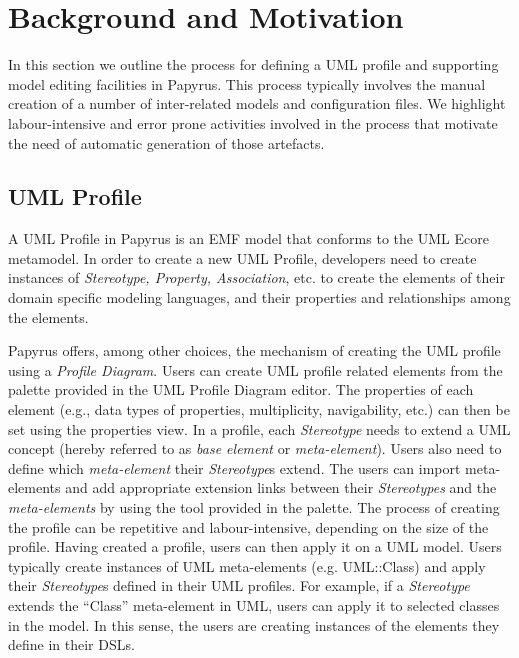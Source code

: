 \section{Background and Motivation}
\label{sec:background}

In this section we outline the process for defining a UML profile and supporting model editing facilities in Papyrus. 
This process typically involves the manual creation of a number of inter-related models and configuration files.
We highlight labour-intensive and error prone activities involved in the process that motivate the need of automatic generation of those artefacts.

\subsection{UML Profile}
A UML Profile in Papyrus is an EMF model that conforms to the UML Ecore metamodel. 
In order to create a new UML Profile, developers need to create instances of \textit{Stereotype, Property, Association}, etc. to create the elements of their domain specific modeling languages, and their properties and relationships among the elements.

Papyrus offers, among other choices, the mechanism of creating the UML profile using a \textit{Profile Diagram}. 
Users can create UML profile related elements from the palette provided in the UML Profile Diagram editor.
The properties of each element (e.g., data types of properties, multiplicity, navigability, etc.) can then be set using the properties view. 
In a profile, each \textit{Stereotype} needs to extend a UML concept (hereby referred to as \textit{base element} or \textit{meta-element}). 
Users also need to define which \textit{meta-element} their \textit{Stereotype}s extend. 
The users can import meta-elements and add appropriate extension links between their \textit{Stereotypes} and the \textit{meta-elements} by using the tool provided in the palette.
The process of creating the profile can be repetitive and labour-intensive, depending on the size of the profile.
Having created a profile, users can then apply it on a UML model. 
Users typically create instances of UML meta-elements (e.g. UML::Class) and apply their \textit{Stereotype}s defined in their UML profiles. 
For example, if a \textit{Stereotype} extends the ``Class'' meta-element in UML, users can apply it to selected classes in the model. 
In this sense, the users are creating instances of the elements they define in their DSLs. 

